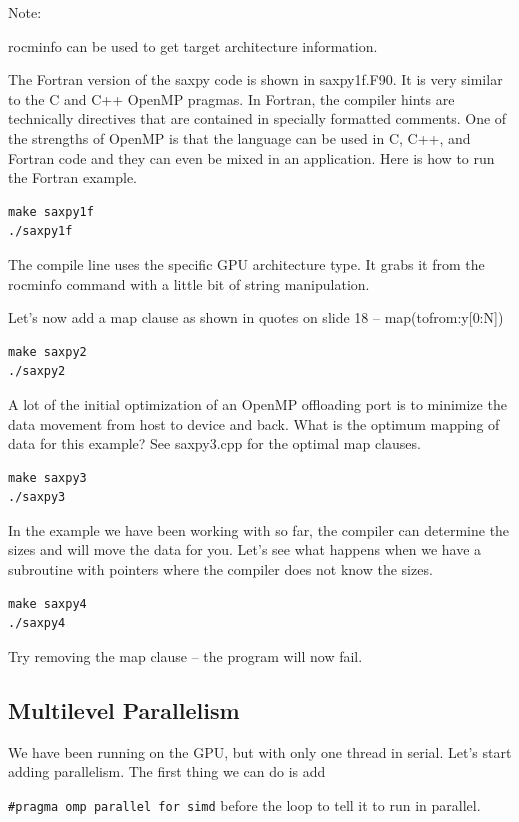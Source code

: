 \documentclass[
]{article}
\let\oldtexttt\texttt
\renewcommand{\texttt}[1]{
  \colorbox{Light}{\oldtexttt{#1}}
}
\begin{document}
Note:

rocminfo can be used to get target architecture information.

The Fortran version of the saxpy code is shown in saxpy1f.F90. It is
very similar to the C and C++ OpenMP pragmas. In Fortran, the compiler
hints are technically directives that are contained in specially
formatted comments. One of the strengths of OpenMP is that the language
can be used in C, C++, and Fortran code and they can even be mixed in an
application. Here is how to run the Fortran example.

\begin{verbatim}
make saxpy1f
./saxpy1f
\end{verbatim}

The compile line uses the specific GPU architecture type. It grabs it
from the rocminfo command with a little bit of string manipulation.

Let's now add a map clause as shown in quotes on slide 18 --
map(tofrom:y{[}0:N{]})

\begin{verbatim}
make saxpy2
./saxpy2
\end{verbatim}

A lot of the initial optimization of an OpenMP offloading port is to
minimize the data movement from host to device and back. What is the
optimum mapping of data for this example? See saxpy3.cpp for the optimal
map clauses.

\begin{verbatim}
make saxpy3
./saxpy3
\end{verbatim}

In the example we have been working with so far, the compiler can
determine the sizes and will move the data for you. Let's see what
happens when we have a subroutine with pointers where the compiler does
not know the sizes.

\begin{verbatim}
make saxpy4
./saxpy4
\end{verbatim}

Try removing the map clause -- the program will now fail.

\hypertarget{multilevel-parallelism}{%
\subsection{Multilevel Parallelism}\label{multilevel-parallelism}}

We have been running on the GPU, but with only one thread in serial.
Let's start adding parallelism. The first thing we can do is add
\texttt{\#pragma\ omp\ parallel\ for\ simd} before the loop to tell it
to run in parallel.
\end{document}
